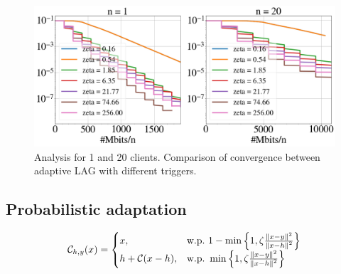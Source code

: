 \documentclass[nohyperref]{article}
\theoremstyle{plain}
\theoremstyle{definition}
\theoremstyle{remark}
\begin{document}
\begin{figure}[!h]
	\centering
	\includegraphics[width=\textwidth]{plots/adaptive/n1_20.png}
	\caption{Analysis for 1 and 20 clients. Comparison of convergence between adaptive LAG with different triggers. }
	\label{fig:anna-100-nodes-grads_main}
\end{figure}

\clearpage

\subsection{Probabilistic adaptation}

\begin{eqnarray}\label{eq:b_marina_compressor}
\mathcal{C}_{h,y}(x) = \begin{cases}x,& \text{w.p.\ } 1 - \min\left\{1, \zeta\frac{\left\| x - y \right\|^{2}}{\left\| x-h \right\|^{2}}\right\}\\ h + \mathcal{C}(x - h),& \text{w.p.\ } \min\left\{1, \zeta\frac{\left\| x - y \right\|^{2}}{\left\| x-h \right\|^{2}}\right\} \end{cases}
\end{eqnarray} 

\end{document}
